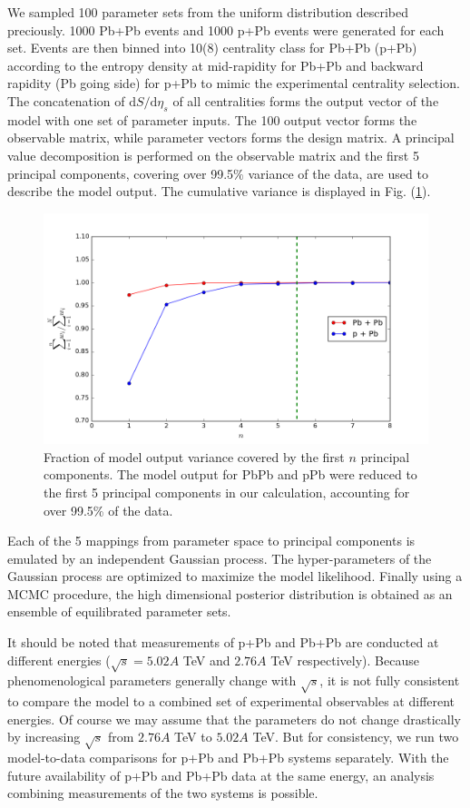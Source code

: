 \documentclass[aps,prl,twocolumn,groupedaddress]{revtex4-1}
\begin{document}
	We sampled 100 parameter sets from the uniform distribution described preciously.
	1000 Pb+Pb events and 1000 p+Pb events were generated for each set.  
	Events are then binned into 10(8) centrality class for Pb+Pb (p+Pb) according to the entropy density at mid-rapidity for Pb+Pb and backward rapidity (Pb going side) for p+Pb to mimic the experimental centrality selection.
	The concatenation of $\mathrm{d}S/\mathrm{d}\eta_s$ of all centralities forms the output vector of the model with one set of parameter inputs. 
	The 100 output vector forms the observable matrix, while parameter vectors forms the design matrix. 
	A principal value decomposition is performed on the observable matrix and the first 5 principal components, covering over 99.5$\%$ variance of the data, are used to describe the model output. 
	The cumulative variance is displayed in Fig. (\ref{weight}).
	
	\begin{figure}
	\begin{center}
	\includegraphics[width=0.9\columnwidth]{pics/weight.png}
	\caption{Fraction of model output variance covered by the first $n$ principal components. The model output for PbPb and pPb were reduced to the first 5 principal components in our calculation, accounting for over 99.5\% of the data.}\label{weight}
	\end{center}
	\end{figure}
	
	Each of the 5 mappings from parameter space to principal components is emulated by an independent Gaussian process.
	The hyper-parameters of the Gaussian process are optimized to maximize the model likelihood.
	Finally using a MCMC procedure, the high dimensional posterior distribution is obtained as an ensemble of equilibrated parameter sets.
	
	It should be noted that measurements of p+Pb and Pb+Pb are conducted at different energies ($\sqrt{s} = 5.02 A$ TeV and $ 2.76 A$ TeV respectively). 
	Because phenomenological parameters generally change with $\sqrt{s}$, it is not fully consistent to compare the model to a combined set of experimental observables at different energies.
	Of course we may assume that the parameters do not change drastically by increasing $\sqrt{s}$ from $2.76 A$ TeV to $5.02 A$ TeV.
	But for consistency, we run two model-to-data comparisons for p+Pb and Pb+Pb systems separately.
	With the future availability of p+Pb and Pb+Pb data at the same energy, an analysis combining measurements of the two systems is possible.
	
\end{document}
